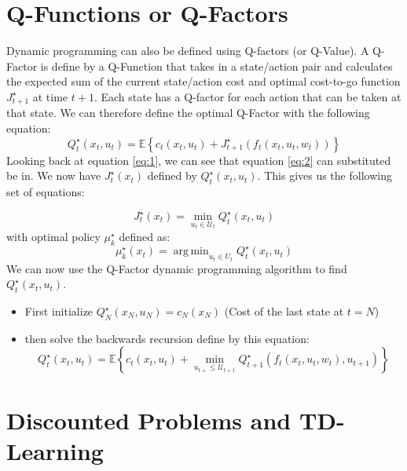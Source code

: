 \documentclass{article}[12pt]
\def\E{\mathbb{E}}
\DeclareMathOperator*{\argmin}{arg\,min}
\def \E{\mathbb E}
\begin{document}
\section{Q-Functions or Q-Factors}

Dynamic programming can also be defined using Q-factors (or Q-Value). A Q-Factor is define by a Q-Function that takes in a state/action pair and calculates the expected sum of the current state/action cost and optimal cost-to-go function $J_{t+1}^\star$ at time $t+1$. Each state has a Q-factor for each action that can be taken at that state. We can therefore define the optimal Q-Factor with the following equation:
\begin{equation}\label{eq:2}
    Q_t^\star(x_t,u_t) = \E\left\{c_t(x_t,u_t) + J_{t+1}^\star(f_t(x_t,u_t,w_t))\right\}
\end{equation}
Looking back at equation \eqref{eq:1}, we can see that equation \eqref{eq:2} can substituted be in. We now have $J_{t}^\star(x_t)$ defined by  $Q_t^\star(x_t,u_t)$. This gives us the following set of equations:

\begin{equation}\label{eq:3}
   J_t^\star(x_t)=\min_{u_t\in\mathcal U_t} Q_t^\star(x_t,u_t)
\end{equation}
with optimal policy $\mu_k^\star$ defined as:
\begin{equation}\label{eq:4}
    \mu_k^\star(x_t)=\argmin_{u_t \in U_t} Q_t^\star(x_t,u_t)
\end{equation}
We can now use the Q-Factor dynamic programming algorithm to find $ Q_t^\star(x_t,u_t)$.
\begin{itemize}
    \item First initialize $Q_N^\star(x_N,u_N) = c_N(x_N)$ (Cost of the last state at $t=N$)
    \item then solve the backwards recursion define by this equation:
    \begin{equation}\label{eq:5}
        Q_{t}^{\star}\left(x_{t}, u_{t}\right)=\mathbb{E}\left\{c_{t}\left(x_{t}, u_{t}\right)+\min _{u_{t+} \leq \mathcal{U}_{t+1}} Q_{t+1}^{\star}\left(f_{t}\left(x_{t}, u_{t}, w_{t}\right), u_{t+1}\right)\right\}
    \end{equation}
\end{itemize}

\newpage
\section{Discounted Problems and TD-Learning} \label{Discounted Problems and TD-Learning}
\end{document}
